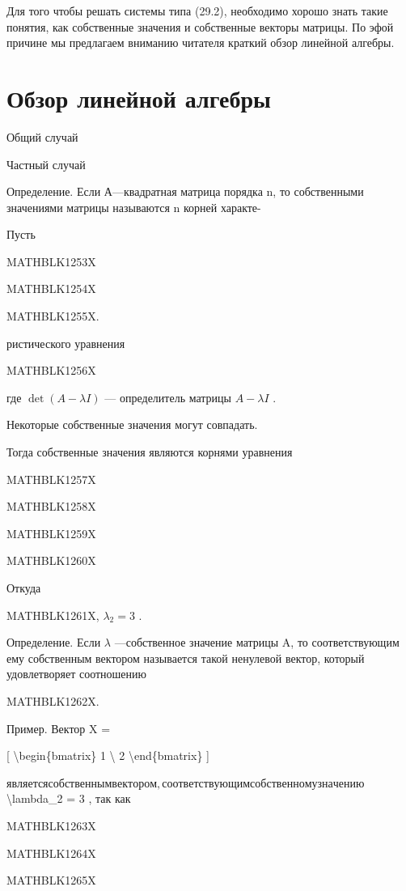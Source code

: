 \documentclass[
]{article}
\begin{document}
{{{Для того чтобы решать системы типа (29.2), необходимо хорошо знать такие
понятия, как собственные значения и собственные векторы матрицы. По эфой
причине мы предлагаем вниманию читателя краткий обзор линейной алгебры.

\section{Обзор линейной
алгебры}\label{ux43eux431ux437ux43eux440-ux43bux438ux43dux435ux439ux43dux43eux439-ux430ux43bux433ux435ux431ux440ux44b}

Общий случай

Частный случай

Определение. Если А---квадратная матрица порядка n, то собственными
значениями матрицы называются n корней характе-

Пусть

MATHBLK1253X

MATHBLK1254X

MATHBLK1255X.

ристического уравнения

MATHBLK1256X

где \(\det(A-\lambda I)\) --- определитель матрицы \(A-\lambda I\) .

Некоторые собственные значения могут совпадать.

Тогда собственные значения являются корнями уравнения

MATHBLK1257X

MATHBLK1258X

MATHBLK1259X

MATHBLK1260X

Откуда

MATHBLK1261X, \(\lambda_2 = 3\) .

Определение. Если \(\lambda\) ---собственное значение матрицы A, то
соответствующим ему собственным вектором называется такой ненулевой
вектор, который удовлетворяет соотношению

MATHBLK1262X.

Пример. Вектор X =

{[} \textbackslash begin\{bmatrix\} 1 \textbackslash{} 2
\textbackslash end\{bmatrix\} {]}

\(является собственным вектором, соответствующим собственному значению\)
\textbackslash lambda\_2 = 3 , так как

MATHBLK1263X

MATHBLK1264X

MATHBLK1265X

}}}
\end{document}
